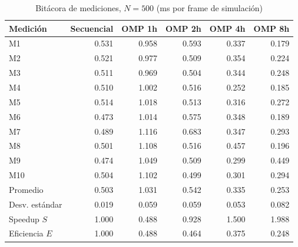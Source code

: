 \begin{table}[H]
\centering\small
\caption{Bitácora de mediciones, $N=500$ (ms por frame de simulación)}
\begin{tabular}{lrrrrr}
\toprule
Medición & Secuencial & OMP 1h & OMP 2h & OMP 4h & OMP 8h \\
\midrule
M1 & 0.531 & 0.958 & 0.593 & 0.337 & 0.179 \\
M2 & 0.521 & 0.977 & 0.509 & 0.354 & 0.224 \\
M3 & 0.511 & 0.969 & 0.504 & 0.344 & 0.248 \\
M4 & 0.510 & 1.002 & 0.516 & 0.252 & 0.185 \\
M5 & 0.514 & 1.018 & 0.513 & 0.316 & 0.272 \\
M6 & 0.473 & 1.014 & 0.575 & 0.348 & 0.189 \\
M7 & 0.489 & 1.116 & 0.683 & 0.347 & 0.293 \\
M8 & 0.501 & 1.108 & 0.516 & 0.457 & 0.196 \\
M9 & 0.474 & 1.049 & 0.509 & 0.299 & 0.449 \\
M10 & 0.504 & 1.102 & 0.499 & 0.301 & 0.294 \\
\midrule
Promedio & 0.503 & 1.031 & 0.542 & 0.335 & 0.253 \\
Desv. estándar & 0.019 & 0.059 & 0.059 & 0.053 & 0.082 \\
Speedup $S$ & 1.000 & 0.488 & 0.928 & 1.500 & 1.988 \\
Eficiencia $E$ & 1.000 & 0.488 & 0.464 & 0.375 & 0.248 \\
\bottomrule
\end{tabular}
\end{table}

